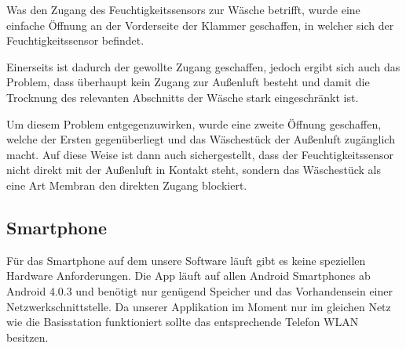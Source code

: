 Was den Zugang des Feuchtigkeitssensors zur Wäsche betrifft, wurde eine einfache Öffnung an der Vorderseite der Klammer geschaffen, in welcher sich der Feuchtigkeitssensor befindet.

Einerseits ist dadurch der gewollte Zugang geschaffen, jedoch ergibt sich auch das Problem, dass überhaupt kein Zugang zur Außenluft besteht und damit die Trocknung des relevanten Abschnitts der Wäsche stark eingeschränkt ist.

Um diesem Problem entgegenzuwirken, wurde eine zweite Öffnung geschaffen, welche der Ersten gegenüberliegt und das Wäschestück der Außenluft zugänglich macht. Auf diese Weise ist dann auch sichergestellt, dass der Feuchtigkeitssensor nicht direkt mit der Außenluft in Kontakt steht, sondern das Wäschestück als eine Art Membran den direkten Zugang blockiert.

\newpage
\subsection{Smartphone}
Für das Smartphone auf dem unsere Software läuft gibt es keine speziellen Hardware Anforderungen. Die App läuft auf allen Android Smartphones ab Android 4.0.3 und benötigt nur genügend Speicher und das Vorhandensein einer Netzwerkschnittstelle. Da unserer Applikation im Moment nur im gleichen Netz wie die Basisstation funktioniert sollte das entsprechende Telefon WLAN besitzen.